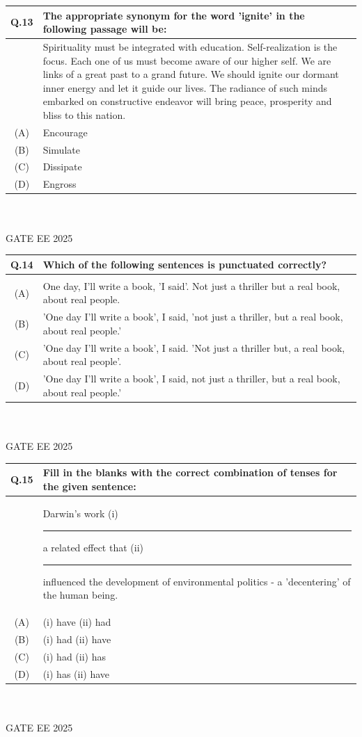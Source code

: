 \documentclass[journal,12pt,onecolumn]{IEEEtran}
\theoremstyle{remark}
\begin{document}
\begin{tabular}{|c|p{16cm}|}\hline
   Q.13 & The appropriate synonym for the word 'ignite' in the following passage will be: \\ \hline
& Spirituality must be integrated with education. Self-realization is the focus. Each one of us must become aware of our higher self. We are links of a great past to a grand future. We should ignite our dormant inner energy and let it guide our lives. The radiance of such minds embarked on constructive endeavor will bring peace, prosperity and bliss to this nation.\\   \hline
(A) & Encourage \\
\hline
(B) & Simulate \\
\hline
(C) & Dissipate \\
\hline
(D) & Engross \\
\hline
\end{tabular} ~\\ \\
GATE EE 2025\\

\begin{tabular}{|c|p{16cm}|}\hline
   Q.14 & Which of the following sentences is punctuated correctly? \\   \hline
     & \\    \hline
 (A) & One day, I'll write a book, 'I said'. Not just a thriller but a real book, about real people. \\
\hline
(B) & 'One day I'll write a book', I said, 'not just a thriller, but a real book, about real people.' \\
\hline
(C) & 'One day I'll write a book', I said. 'Not just a thriller but, a real book, about real people'. \\
\hline
(D) & 'One day I'll write a book', I said, not just a thriller, but a real book, about real people.' \\
\hline
\end{tabular} ~\\ \\
GATE EE 2025\\

\begin{tabular}{|c|p{16cm}|}\hline
   Q.15 & Fill in the blanks with the correct combination of tenses for the given sentence: \\ \hline
 & Darwin's work (i)\rule{2cm}{0.4pt} a related effect that (ii)\rule{2cm}{0.4pt} influenced the development of environmental politics - a 'decentering' of the human being. \\   \hline
(A) & (i) have (ii) had \\
\hline
(B) & (i) had (ii) have \\
\hline
(C) & (i) had (ii) has \\
\hline
(D) & (i) has (ii) have \\
\hline
\end{tabular} ~\\ \\
GATE EE 2025\\
\end{document}
